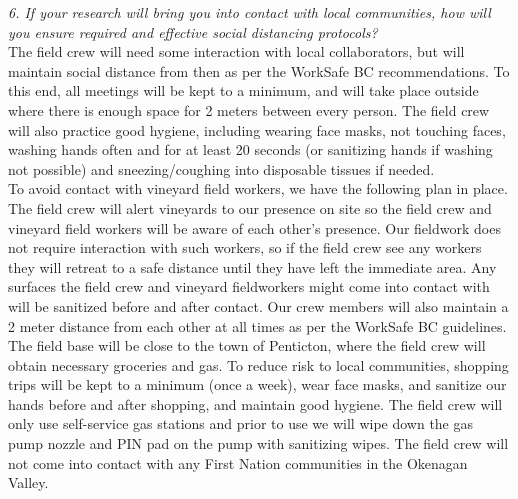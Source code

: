 \documentclass[11pt,letter]{article}
\begin{document}
\emph{6. If your research will bring you into contact with local communities, how will you ensure required and effective social distancing protocols?}\\

The field crew will need some interaction with local collaborators, but will maintain social distance from then as per the WorkSafe BC recommendations. To this end, all meetings will be kept to a minimum, and will take place outside where there is enough space for 2 meters between every person. The field crew will also practice good hygiene, including wearing face masks, not touching faces, washing hands often and for at least 20 seconds (or sanitizing hands if washing not possible) and sneezing/coughing into disposable tissues if needed. \\

To avoid contact with vineyard field workers, we have the following plan in place. The field crew will alert vineyards to our presence on site so the field crew and vineyard field workers will be aware of each other's presence. Our fieldwork does not require interaction with such workers, so if the field crew see any workers they will retreat to a safe distance until they have left the immediate area. Any surfaces the field crew and vineyard fieldworkers might come into contact with will be sanitized before and after contact. Our crew members will also maintain a 2 meter distance from each other at all times as per the WorkSafe BC guidelines. \\

The field base will be close to the town of Penticton, where the field crew will obtain necessary groceries and gas. To reduce risk to local communities, shopping trips will be kept to a minimum (once a week), wear face masks, and sanitize our hands before and after shopping, and maintain good hygiene. The field crew will only use self-service gas stations and prior to use we will wipe down the gas pump nozzle and PIN pad on the pump with sanitizing wipes. The field crew will not come into contact with any First Nation communities in the Okenagan Valley.\\ 
\end{document}
